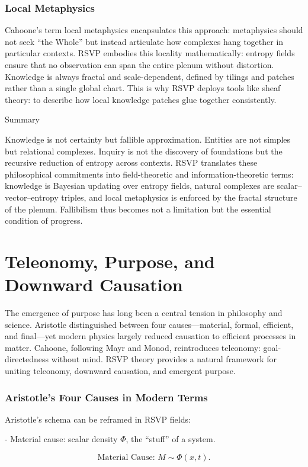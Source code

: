 \documentclass[12pt]{book}
\begin{document}
\subsection{Local Metaphysics}
Cahoone’s term local metaphysics encapsulates this approach: metaphysics should not seek “the Whole” but instead articulate how complexes hang together in particular contexts. RSVP embodies this locality mathematically: entropy fields ensure that no observation can span the entire plenum without distortion. Knowledge is always fractal and scale-dependent, defined by tilings and patches rather than a single global chart. This is why RSVP deploys tools like sheaf theory: to describe how local knowledge patches glue together consistently.

Summary

Knowledge is not certainty but fallible approximation. Entities are not simples but relational complexes. Inquiry is not the discovery of foundations but the recursive reduction of entropy across contexts. RSVP translates these philosophical commitments into field-theoretic and information-theoretic terms: knowledge is Bayesian updating over entropy fields, natural complexes are scalar–vector–entropy triples, and local metaphysics is enforced by the fractal structure of the plenum. Fallibilism thus becomes not a limitation but the essential condition of progress.

\chapter{Teleonomy, Purpose, and Downward Causation}
The emergence of purpose has long been a central tension in philosophy and science. Aristotle distinguished between four causes—material, formal, efficient, and final—yet modern physics largely reduced causation to efficient processes in matter. Cahoone, following Mayr and Monod, reintroduces teleonomy: goal-directedness without mind. RSVP theory provides a natural framework for uniting teleonomy, downward causation, and emergent purpose.

\subsection{Aristotle’s Four Causes in Modern Terms}
Aristotle’s schema can be reframed in RSVP fields:

- Material cause: scalar density \( \Phi \), the “stuff” of a system.

  \[ \text{Material Cause: } M \sim \Phi(x,t). \]
\end{document}
